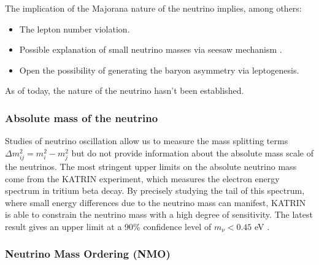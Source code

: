 \documentclass[../main.tex]{subfiles}
\begin{document}
The implication of the Majorana nature of the neutrino implies, among others:
\begin{itemize}
  \item The lepton number violation.

  \item Possible explanation of small neutrino masses via seesaw mechanism \cite{yanagida_horizontal_1980}.

  \item Open the possibility of generating the baryon asymmetry via leptogenesis.
\end{itemize}

As of today, the nature of the neutrino hasn't been established.

\subsubsection{Absolute mass of the neutrino}

Studies of neutrino oscillation allow us to measure the mass splitting terms $\Delta m^2_{ij} = m^2_{i} - m^2_{j}$ but do not provide information about the absolute mass scale of the neutrinos.
The most stringent upper limits on the absolute neutrino mass come from the KATRIN experiment, which measures the electron energy spectrum in tritium beta decay. By precisely studying the tail of this spectrum, where small energy differences due to the neutrino mass can manifest, KATRIN is able to constrain the neutrino mass with a high degree of sensitivity. The latest result gives an upper limit at a 90\% confidence level of $m_\nu < 0.45$ eV \cite{aker_direct_2024}.

\subsubsection{Neutrino Mass Ordering (NMO)}
\end{document}
